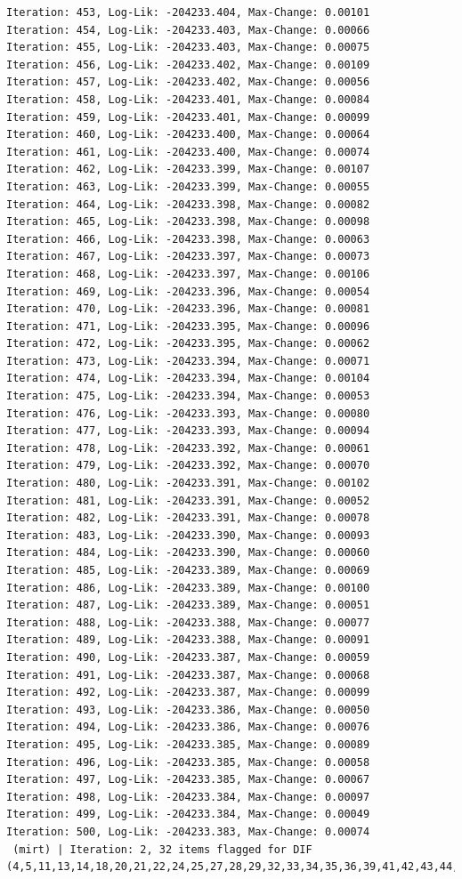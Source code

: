 \documentclass[
  letterpaper,
  DIV=11,
  numbers=noendperiod]{scrreport}
\begin{document}
\begin{verbatim}
Iteration: 453, Log-Lik: -204233.404, Max-Change: 0.00101
Iteration: 454, Log-Lik: -204233.403, Max-Change: 0.00066
Iteration: 455, Log-Lik: -204233.403, Max-Change: 0.00075
Iteration: 456, Log-Lik: -204233.402, Max-Change: 0.00109
Iteration: 457, Log-Lik: -204233.402, Max-Change: 0.00056
Iteration: 458, Log-Lik: -204233.401, Max-Change: 0.00084
Iteration: 459, Log-Lik: -204233.401, Max-Change: 0.00099
Iteration: 460, Log-Lik: -204233.400, Max-Change: 0.00064
Iteration: 461, Log-Lik: -204233.400, Max-Change: 0.00074
Iteration: 462, Log-Lik: -204233.399, Max-Change: 0.00107
Iteration: 463, Log-Lik: -204233.399, Max-Change: 0.00055
Iteration: 464, Log-Lik: -204233.398, Max-Change: 0.00082
Iteration: 465, Log-Lik: -204233.398, Max-Change: 0.00098
Iteration: 466, Log-Lik: -204233.398, Max-Change: 0.00063
Iteration: 467, Log-Lik: -204233.397, Max-Change: 0.00073
Iteration: 468, Log-Lik: -204233.397, Max-Change: 0.00106
Iteration: 469, Log-Lik: -204233.396, Max-Change: 0.00054
Iteration: 470, Log-Lik: -204233.396, Max-Change: 0.00081
Iteration: 471, Log-Lik: -204233.395, Max-Change: 0.00096
Iteration: 472, Log-Lik: -204233.395, Max-Change: 0.00062
Iteration: 473, Log-Lik: -204233.394, Max-Change: 0.00071
Iteration: 474, Log-Lik: -204233.394, Max-Change: 0.00104
Iteration: 475, Log-Lik: -204233.394, Max-Change: 0.00053
Iteration: 476, Log-Lik: -204233.393, Max-Change: 0.00080
Iteration: 477, Log-Lik: -204233.393, Max-Change: 0.00094
Iteration: 478, Log-Lik: -204233.392, Max-Change: 0.00061
Iteration: 479, Log-Lik: -204233.392, Max-Change: 0.00070
Iteration: 480, Log-Lik: -204233.391, Max-Change: 0.00102
Iteration: 481, Log-Lik: -204233.391, Max-Change: 0.00052
Iteration: 482, Log-Lik: -204233.391, Max-Change: 0.00078
Iteration: 483, Log-Lik: -204233.390, Max-Change: 0.00093
Iteration: 484, Log-Lik: -204233.390, Max-Change: 0.00060
Iteration: 485, Log-Lik: -204233.389, Max-Change: 0.00069
Iteration: 486, Log-Lik: -204233.389, Max-Change: 0.00100
Iteration: 487, Log-Lik: -204233.389, Max-Change: 0.00051
Iteration: 488, Log-Lik: -204233.388, Max-Change: 0.00077
Iteration: 489, Log-Lik: -204233.388, Max-Change: 0.00091
Iteration: 490, Log-Lik: -204233.387, Max-Change: 0.00059
Iteration: 491, Log-Lik: -204233.387, Max-Change: 0.00068
Iteration: 492, Log-Lik: -204233.387, Max-Change: 0.00099
Iteration: 493, Log-Lik: -204233.386, Max-Change: 0.00050
Iteration: 494, Log-Lik: -204233.386, Max-Change: 0.00076
Iteration: 495, Log-Lik: -204233.385, Max-Change: 0.00089
Iteration: 496, Log-Lik: -204233.385, Max-Change: 0.00058
Iteration: 497, Log-Lik: -204233.385, Max-Change: 0.00067
Iteration: 498, Log-Lik: -204233.384, Max-Change: 0.00097
Iteration: 499, Log-Lik: -204233.384, Max-Change: 0.00049
Iteration: 500, Log-Lik: -204233.383, Max-Change: 0.00074
 (mirt) | Iteration: 2, 32 items flagged for DIF (4,5,11,13,14,18,20,21,22,24,25,27,28,29,32,33,34,35,36,39,41,42,43,44,46,47,48,50,51,52,54,58)


\end{verbatim}
\end{document}
